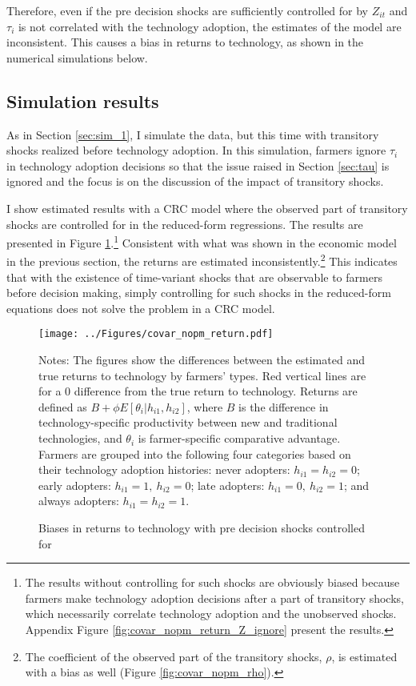 \documentclass[11pt,letterpaper]{article}
\begin{document}
Therefore, even if the pre decision shocks are sufficiently controlled for by $Z_{it}$ and $\tau_i$ is not correlated with the technology adoption, the estimates of the model are inconsistent.
This causes a bias in returns to technology, as shown in the numerical simulations below.

\subsection{Simulation results}

As in Section \ref{sec:sim_1}, I simulate the data, but this time with transitory shocks realized before technology adoption.
In this simulation, farmers ignore $\tau_i$ in technology adoption decisions so that the issue raised in Section \ref{sec:tau} is ignored and the focus is on the discussion of the impact of transitory shocks.

I show estimated results with a CRC model where the observed part of transitory shocks are controlled for in the reduced-form regressions.
The results are presented in Figure \ref{fig:covar_nopm_return}.\footnote{
  The results without controlling for such shocks are obviously biased because farmers make technology adoption decisions after a part of transitory shocks, which necessarily correlate technology adoption and the unobserved shocks. 
  Appendix Figure \ref{fig:covar_nopm_return_Z_ignore} present the results.
}
Consistent with what was shown in the economic model in the previous section, the returns are estimated inconsistently.\footnote{
  The coefficient of the observed part of the transitory shocks, $\rho$, is estimated with a bias as well (Figure \ref{fig:covar_nopm_rho}).
}
This indicates that with the existence of time-variant shocks that are observable to farmers before decision making, simply controlling for such shocks in the reduced-form equations does not solve the problem in a CRC model.

\begin{figure}[H]
  \centering
  \caption{Biases in returns to technology with pre decision shocks controlled for}
  \texttt{[image: ../Figures/covar\_nopm\_return.pdf]}
  \label{fig:covar_nopm_return}
  \footnotesize
  \begin{tablenotes}
    \item Notes:
      The figures show the differences between the estimated and true returns to technology by farmers' types.
      Red vertical lines are for a 0 difference from the true return to technology.
      Returns are defined as $B + \phi E[\theta_i | h_{i1}, h_{i2}]$, where $B$ is the difference in technology-specific productivity between new and traditional technologies, and $\theta_i$ is farmer-specific comparative advantage.
      Farmers are grouped into the following four categories based on their technology adoption histories:
      never adopters: $h_{i1} = h_{i2} = 0$;
      early adopters: $h_{i1} = 1, \ h_{i2} = 0$;
      late adopters: $h_{i1} = 0, \ h_{i2} = 1$; and
      always adopters: $h_{i1} = h_{i2} = 1$.
  \end{tablenotes}
\end{figure}
\end{document}
